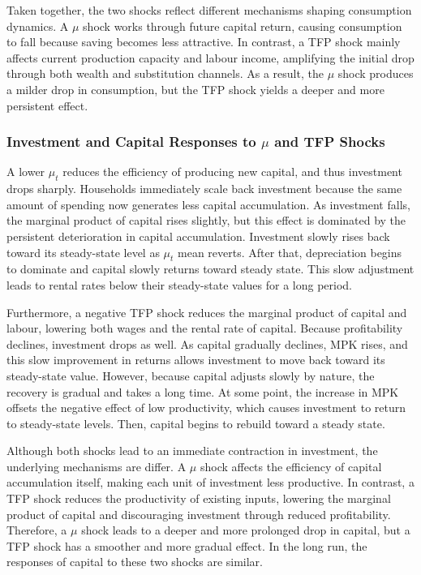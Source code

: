 \documentclass[12pt]{article}
\begin{document}
Taken together, the two shocks reflect different mechanisms shaping consumption dynamics.  A $\mu$ shock works through future capital return, causing consumption to fall because saving becomes less attractive. In contrast, a TFP shock mainly affects current production capacity and labour income, amplifying the initial drop through both wealth and substitution channels. As a result, the $\mu$ shock produces a milder drop in consumption, but the TFP shock yields a deeper and more persistent effect.
\subsubsection{Investment and Capital Responses to $\mu$ and TFP Shocks}

A lower $\mu_t$ reduces the efficiency of producing new capital, and  thus investment drops sharply. Households immediately scale back investment because the same amount of spending now generates less capital accumulation. As investment falls, the marginal product of capital rises slightly, but this effect is dominated by the persistent deterioration in capital accumulation. Investment slowly rises back toward its steady-state level as $\mu_t$ mean reverts. After that, depreciation begins to dominate and capital slowly returns toward steady state. This slow adjustment leads to rental rates below their steady-state values for a long period. 

Furthermore, a negative TFP shock reduces the marginal product of capital and labour, lowering both wages and the rental rate of capital. Because profitability declines, investment drops as well. As capital gradually declines, MPK rises, and this slow improvement in returns allows investment to move back toward its steady-state value. However, because capital adjusts slowly by nature, the recovery is gradual and takes a long time. At some point, the increase in MPK offsets the negative effect of low productivity, which causes investment to return to steady-state levels. Then, capital begins to rebuild toward a steady state.

Although both shocks lead to an immediate contraction in investment, the underlying mechanisms are differ. A $\mu$ shock affects the efficiency of capital accumulation itself, making each unit of investment less productive. In contrast, a TFP shock reduces the productivity of existing inputs, lowering the marginal product of capital and discouraging investment through reduced profitability.
Therefore, a $\mu$ shock leads to a deeper and more prolonged drop in capital, but a TFP shock has a  smoother and more gradual effect. In the long run, the responses of capital to these two shocks are similar.
\end{document}
